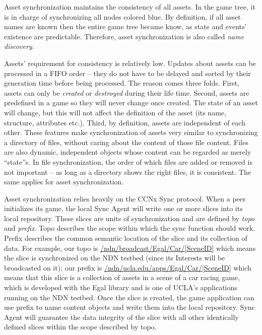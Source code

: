 Asset synchronization maintains the consistency of all assets. In the game tree, it is in charge of synchronizing all nodes colored blue. By definition, if all asset names are known then the entire game tree became know, as state and events' existence are predictable. Therefore, asset synchronization is also called \emph{name discovery}.

Assets' requirement for consistency is relatively low. Updates about assets can be processed in a FIFO order -- they do not have to be delayed and sorted by their generation time before being processed. The reason comes three folds. First, assets can only be \emph{created} or \emph{destroyed} during their life time. Second, assets are predefined in a game so they will never change once created. The state of an asset will change, but this will not affect the definition of the asset (its name, structure, attributes etc.). Third, by definition, assets are independent of each other. These features make synchronization of assets very similar to synchronizing a directory of files, without caring about the content of those file content.  Files are also dynamic, independent objects whose content can be regarded as merely ``state''s. In file synchronization, the order of which files are added or removed is not important -- as long as a directory shows the right files, it is consistent. The same applies for asset synchronization.

Asset synchronization relies heavily on the CCNx Sync protocol. When a peer initializes its game, the local Sync Agent will write one or more slices into its local repository. These slices are units of synchronization and are defined by \emph{topo} and \emph{prefix}. Topo describes the scope within which the sync function should work. Prefix describes the common semantic location of the slice and its collection of data. For example, our topo is \url{/ndn/broadcast/Egal/Car/[SceneID]} which means the slice is synchronized on the NDN testbed (since its Interests will be broadcasted on it); our prefix is \url{/ndn/ucla.edu/apps/Egal/Car/[SceneID]} which means that this slice is a collection of assets in a scene of a car racing game, which is developed with the Egal library and is one of UCLA's applications running on the NDN testbed. Once the slice is created, the game application can use prefix to name content objects and write them into the local repository. Sync Agent will guarantee the data integrity of the slice with all other identically defined slices within the scope described by topo.

